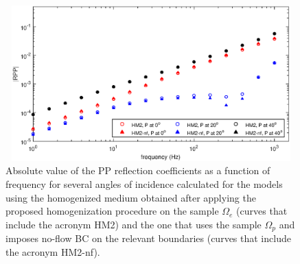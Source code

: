\documentclass[draft]{agujournal2019}
\begin{document}
\begin{figure}[!ht]
\centering
        \includegraphics[width= 120mm, height=60mm]{rpp_2sandfracw.eps}
\caption{Absolute value of the PP reflection coefficients as a function of frequency for several angles of incidence calculated for the models using the homogenized medium obtained after applying the proposed homogenization procedure on the sample $\Omega_e$ (curves that include the acronym HM2) and the one that uses the sample $\Omega_p$ and imposes no-flow BC on the relevant boundaries (curves that include the acronym HM2-nf).}
\label{fig.10}
\end{figure}
\end{document}
